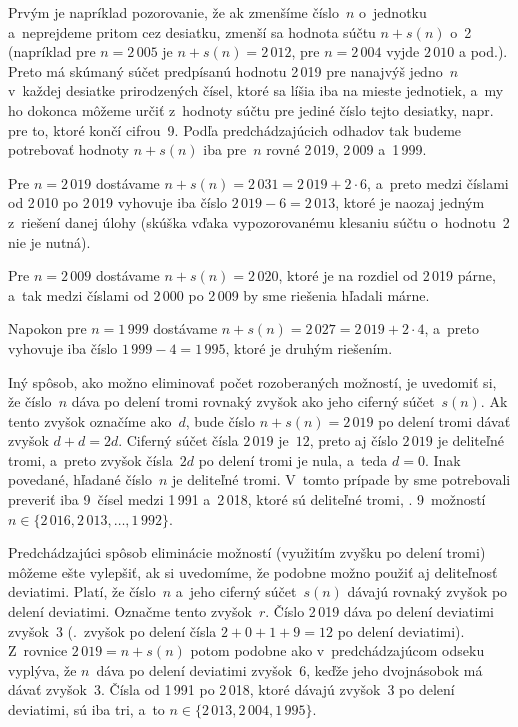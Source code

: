 {Prvým je napríklad pozorovanie, že ak zmenšíme číslo~$n$
o~jednotku a~neprejdeme pritom cez desiatku, zmenší sa hodnota súčtu
$n+s(n)$ o~2 (napríklad pre $n = 2\,005$ je $n+s(n) = 2\,012$, pre
$n = 2\,004$ vyjde $2\,010$ a pod.).
Preto má skúmaný súčet predpísanú hodnotu 2\,019 pre nanajvýš jedno~$n$
v~každej desiatke prirodzených čísel, ktoré sa líšia iba na mieste
jednotiek, a~my ho dokonca môžeme určiť z~hodnoty súčtu pre jediné číslo
tejto desiatky, napr. pre to, ktoré končí cifrou~9. Podľa predchádzajúcich odhadov
tak budeme potrebovať hodnoty $n+s(n)$ iba pre~$n$ rovné 2\,019,
2\,009 a~1\,999.

Pre $n = 2\,019$ dostávame
$n+s(n) = 2\,031 = 2\,019+2 \cdot 6$, a~preto medzi číslami od 2\,010 po 2\,019
vyhovuje iba číslo $2\,019-6 = 2\,013$, ktoré je naozaj
jedným z~riešení danej úlohy (skúška vďaka vypozorovanému klesaniu súčtu o~hodnotu~2
nie je nutná).

Pre $n = 2\,009$ dostávame
$n+s(n) = 2\,020$, ktoré je na rozdiel od 2\,019 párne, a~tak medzi
číslami od 2\,000 po 2\,009 by sme riešenia hľadali márne.

Napokon pre $n = 1\,999$ dostávame $n+s(n) = 2\,027 = 2\,019+2 \cdot 4$, a~preto
vyhovuje iba číslo $1\,999-4 = 1\,995$, ktoré je druhým riešením.

\medskip
Iný spôsob, ako možno eliminovať počet rozoberaných možností, je
uvedomiť si, že číslo~$n$ dáva po delení tromi rovnaký zvyšok
ako jeho ciferný súčet~$s(n)$. Ak tento zvyšok označíme ako~$d$,
bude číslo $n+s(n) = 2\,019$ po delení tromi dávať zvyšok $d+d = 2d$.
Ciferný súčet čísla $2\,019$ je~$12$, preto aj číslo $2\,019$ je
deliteľné tromi, a~preto zvyšok čísla~$2d$ po delení tromi je nula,
a~teda $d = 0$. Inak povedané, hľadané číslo~$n$ je deliteľné tromi.
V~tomto prípade by sme potrebovali preveriť iba 9~čísel medzi 1\,991 a~2\,018,
ktoré sú deliteľné tromi, \tj. 9~možností $n \in\{2\,016, 2\,013, \dots, 1\,992\}$.

\medskip
Predchádzajúci spôsob eliminácie možností (využitím zvyšku po
delení tromi) môžeme ešte vylepšiť, ak si uvedomíme, že
podobne možno použiť aj deliteľnosť deviatimi. Platí, že číslo~$n$
a~jeho ciferný súčet~$s(n)$ dávajú rovnaký zvyšok po delení
deviatimi. Označme tento zvyšok~$r$. Číslo 2\,019 dáva
po delení deviatimi zvyšok~$3$ (\tj.~zvyšok po delení čísla
$2+0+1+9 = 12$ po delení deviatimi). Z~rovnice $2\,019 = n+s(n)$ potom
podobne ako v~predchádzajúcom odseku vyplýva, že $n$~dáva po
delení deviatimi zvyšok~6, keďže jeho dvojnásobok má dávať
zvyšok~3. Čísla od 1\,991 po 2\,018, ktoré dávajú zvyšok~3 po
delení deviatimi, sú iba tri, a~to $n \in\{2\,013, 2\,004, 1\,995\}$.

}
